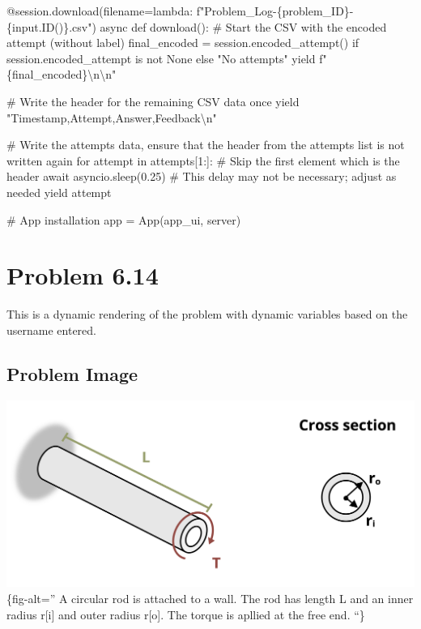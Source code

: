 \documentclass[
  letterpaper,
  DIV=11,
  numbers=noendperiod]{scrreprt}
\newenvironment{Shaded}{\begin{snugshade}}{\end{snugshade}}
\newcommand{\NormalTok}[1]{\textcolor[rgb]{0.00,0.23,0.31}{#1}}
\begin{document}
\begin{Shaded}
\begin{Highlighting}[]
\NormalTok{    @session.download(filename=lambda: f"Problem\_Log{-}\{problem\_ID\}{-}\{input.ID()\}.csv")}
\NormalTok{    async def download():}
\NormalTok{        \# Start the CSV with the encoded attempt (without label)}
\NormalTok{        final\_encoded = session.encoded\_attempt() if session.encoded\_attempt is not None else "No attempts"}
\NormalTok{        yield f"\{final\_encoded\}\textbackslash{}n\textbackslash{}n"}
        
\NormalTok{        \# Write the header for the remaining CSV data once}
\NormalTok{        yield "Timestamp,Attempt,Answer,Feedback\textbackslash{}n"}
        
\NormalTok{        \# Write the attempts data, ensure that the header from the attempts list is not written again}
\NormalTok{        for attempt in attempts[1:]:  \# Skip the first element which is the header}
\NormalTok{            await asyncio.sleep(0.25)  \# This delay may not be necessary; adjust as needed}
\NormalTok{            yield attempt}


\NormalTok{\# App installation}
\NormalTok{app = App(app\_ui, server)}
\end{Highlighting}
\end{Shaded}

\chapter*{Problem 6.14}\label{problem-6.14}


This is a dynamic rendering of the problem with dynamic variables based
on the username entered.

\section*{Problem Image}\label{problem-image-67}


\includegraphics{images/270.png}\{fig-alt='' A circular rod is attached
to a wall. The rod has length L and an inner radius r{[}i{]} and outer
radius r{[}o{]}. The torque is apllied at the free end. ``\}
\end{document}

